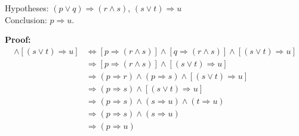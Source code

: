 \begin{enumerate}
      Hypotheses: $(p \lor q) \Rightarrow (r \land s)$,
                  $(s \lor t) \Rightarrow u$ \\
      Conclusion: $p \Rightarrow u$.

      \textbf{Proof:}
      \begin{align*}
         [(p \lor q) \Rightarrow (r \land s)] \land [(s \lor t) \Rightarrow u]
         &\Leftrightarrow [p \Rightarrow (r \land s)] \land
         [q \Rightarrow (r \land s)] \land [(s \lor t) \Rightarrow u] \\
         &\Rightarrow [p \Rightarrow (r \land s)] \land
         [(s \lor t) \Rightarrow u] \\
         &\Rightarrow (p \Rightarrow r) \land (p \Rightarrow s) \land
         [(s \lor t) \Rightarrow u] \\
         &\Rightarrow (p \Rightarrow s) \land [(s \lor t) \Rightarrow u] \\
         &\Rightarrow (p \Rightarrow s) \land (s \Rightarrow u) \land
         (t \Rightarrow u) \\
         &\Rightarrow (p \Rightarrow s) \land (s \Rightarrow u) \\
         &\Rightarrow (p \Rightarrow u)
      \end{align*}

      
\end{enumerate}
